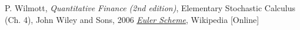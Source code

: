\begin{thebibliography}{9}
 P. Wilmott, \emph{Quantitative Finance (2nd edition)}, Elementary Stochastic Calculus (Ch. 4), John Wiley and Sons, 2006 
 \href{https://en.wikipedia.org/wiki/Euler_method}{\emph{Euler Scheme}}, Wikipedia [Online]
\end{thebibliography}









